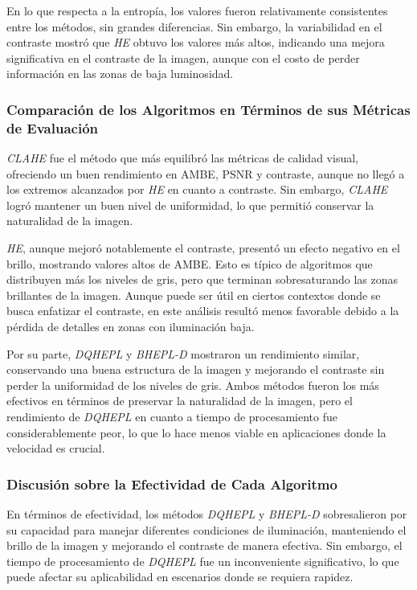 \documentclass[sigchi]{acmart}
\begin{document}
En lo que respecta a la entropía, los valores fueron relativamente consistentes entre los
métodos, sin grandes diferencias. Sin embargo, la variabilidad en el contraste mostró que
\emph{HE} obtuvo los valores más altos, indicando una mejora significativa en el contraste de
la imagen, aunque con el costo de perder información en las zonas de baja luminosidad.

\subsubsection{Comparación de los Algoritmos en Términos de sus Métricas de Evaluación}

\emph{CLAHE} fue el método que más equilibró las métricas de calidad visual, ofreciendo un
buen rendimiento en AMBE, PSNR y contraste, aunque no llegó a los extremos alcanzados por
\emph{HE} en cuanto a contraste. Sin embargo, \emph{CLAHE} logró mantener un buen nivel de
uniformidad, lo que permitió conservar la naturalidad de la imagen.

\emph{HE}, aunque mejoró notablemente el contraste, presentó un efecto negativo en el brillo,
mostrando valores altos de AMBE. Esto es típico de algoritmos que distribuyen más los niveles
de gris, pero que terminan sobresaturando las zonas brillantes de la imagen. Aunque puede ser
útil en ciertos contextos donde se busca enfatizar el contraste, en este análisis resultó menos
favorable debido a la pérdida de detalles en zonas con iluminación baja.

Por su parte, \emph{DQHEPL} y \emph{BHEPL-D} mostraron un rendimiento similar, conservando
una buena estructura de la imagen y mejorando el contraste sin perder la uniformidad de los
niveles de gris. Ambos métodos fueron los más efectivos en términos de preservar la naturalidad
de la imagen, pero el rendimiento de \emph{DQHEPL} en cuanto a tiempo de procesamiento fue
considerablemente peor, lo que lo hace menos viable en aplicaciones donde la velocidad es
crucial.

\subsubsection{Discusión sobre la Efectividad de Cada Algoritmo}

En términos de efectividad, los métodos \emph{DQHEPL} y \emph{BHEPL-D} sobresalieron por su
capacidad para manejar diferentes condiciones de iluminación, manteniendo el brillo de la
imagen y mejorando el contraste de manera efectiva. Sin embargo, el tiempo de procesamiento de
\emph{DQHEPL} fue un inconveniente significativo, lo que puede afectar su aplicabilidad en
escenarios donde se requiera rapidez.
\end{document}
